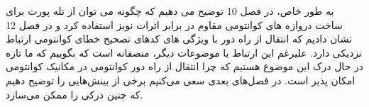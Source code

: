 \documentclass{book}
\begin{document}
به طور خاص، در فصل 10 توضیح می دهیم که چگونه می توان از تله پورت برای ساخت دروازه های کوانتومی مقاوم در برابر اثرات نویز استفاده کرد و در فصل 12 نشان دادیم که انتقال از راه دور با ویژگی های کدهای تصحیح خطای کوانتومی ارتباط نزدیکی دارد. علیرغم این ارتباط با موضوعات دیگر، منصفانه است که بگوییم که ما تازه در حال درک این موضوع هستیم که چرا انتقال از راه دور کوانتومی در مکانیک کوانتومی امکان پذیر است. در فصل‌های بعدی سعی می‌کنیم برخی از بینش‌هایی را توضیح دهیم که چنین درکی را ممکن می‌سازد.



\newpage
	
	
	
\end{document}
